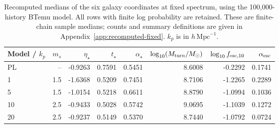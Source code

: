 \begin{table}[t]\centering\small
\caption{Recomputed medians of the six galaxy coordinates at fixed spectrum, using the 100,000-history BTemu model. All rows with finite log probability are retained. These are finite-chain sample medians; counts and summary definitions are given in Appendix~\ref{app:recomputed-fixed}. $k_p$ is in $h\,\mathrm{Mpc}^{-1}$.}\label{tab:fixed-100k}
\begin{tabular*}{\textwidth}{@{\extracolsep{\fill}}lrrrrrrr}\toprule
Model / $k_p$ & $m_s$ & $\eta_\star$ & $t_\star$ & $\alpha_\star$ & $\log_{10}(M_{\rm turn}/M_\odot)$ & $\log_{10} f_{{\rm esc},10}$ & $\alpha_{\rm esc}$\\\midrule
PL & -- & -0.9263 & 0.7591 & 0.5451 & 8.6008 & -0.2292 & 0.1741\\
1 & 1.5 & -1.6368 & 0.5209 & 0.7451 & 8.7106 & -1.2265 & 0.2289\\
5 & 1.5 & -1.0154 & 0.5218 & 0.6611 & 8.8790 & -1.0994 & 0.1036\\
10 & 2.5 & -0.9433 & 0.5028 & 0.5742 & 9.0695 & -1.1039 & 0.1272\\
20 & 2.5 & -0.9237 & 0.5149 & 0.5370 & 8.7440 & -1.0792 & 0.0724\\
\bottomrule\end{tabular*}\end{table}
